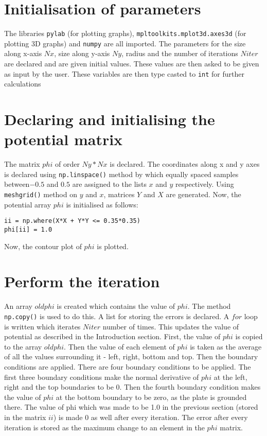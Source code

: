 \documentclass[11pt, a4paper]{article}
\begin{document}
\section{Initialisation of parameters}
The libraries \texttt{pylab} (for plotting graphs), \texttt{mpltoolkits.mplot3d.axes3d} (for plotting 3D graphs) and \texttt{numpy} are all imported. The parameters  for the size along x-axis \(Nx\), size along y-axis \(Ny\), radius and the number of iterations \(Niter\) are declared and are given initial values. These values are then asked to be given as input by the user. These variables are then type casted to \texttt{int} for further calculations

\section{Declaring and initialising the potential matrix}
The matrix \(phi\) of order \(Ny * Nx\) is declared. The coordinates along x and y axes is declared using \texttt{np.linspace()} method by which equally spaced samples between\(-0.5\) and \(0.5\) are assigned to the lists \(x\) and \(y\) respectively. Using \texttt{meshgrid()} method on \(y\) and \(x\), matrices \(Y\) and \(X\) are generated. Now, the potential array \(phi\) is initialised as follows:
\begin{verbatim}
ii = np.where(X*X + Y*Y <= 0.35*0.35)
phi[ii] = 1.0
\end{verbatim}

Now, the contour plot of \(phi\) is plotted.

\section{Perform the iteration}
An array \(oldphi\) is created which contains the value of \(phi\). The method \texttt{np.copy()} is used to do this. A list for storing the errors is declared. A \(for\) loop is written which iterates \(Niter\) number of times. This updates the value of potential as described in the Introduction section. 
First, the value of \(phi\) is copied to the array \(oldphi\). Then the value of each element of \(phi\) is taken as the average of all the values surrounding it - left, right, bottom and top. Then the boundary conditions are applied.  There are four boundary conditions to be applied. The first three boundary conditions make the normal derivative of \(phi\) at the left, right and the top boundaries to be \(0\). Then the fourth boundary condition makes the value of \(phi\) at the bottom boundary to be zero, as the plate is grounded there. The value of phi which was made to be 1.0 in the previous section (stored in the matrix \(ii\)) is made 0 as well after every iteration. The error after every iteration is stored as the maximum change to an element in the \(phi\) matrix.
\end{document}

